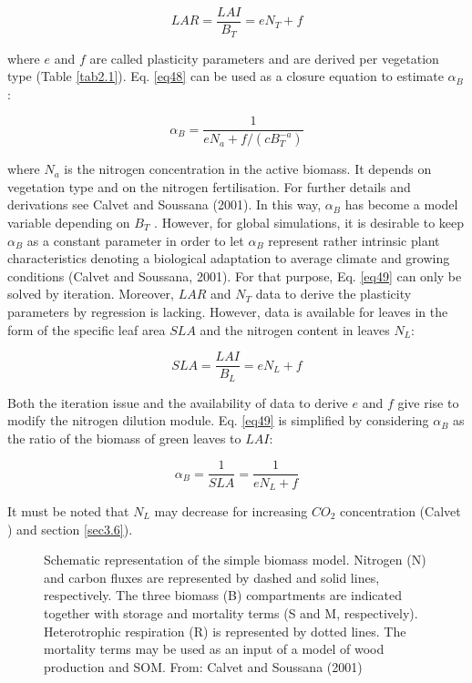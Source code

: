 {\begin{equation}\label{eq48}
LAR = \frac{LAI}{B_{T}}=eN_{T}+f
\end{equation}


where $e$ and $f$ are called plasticity parameters and are derived per vegetation type (Table \ref{tab2.1}). Eq. \ref{eq48} 
can be used as a closure equation to estimate $\alpha_{B}$:

\begin{equation}\label{eq49}
\alpha_{B} = \frac{1}{eN_{a}+f/(cB_{T}^{-a})}
\end{equation}

where $N_{a}$ is the nitrogen concentration in the active biomass. It depends on vegetation type and on the
nitrogen fertilisation. For further details and derivations see Calvet and Soussana (2001). In this way,
$\alpha_{B}$ has become a model variable depending on $B_{T}$ . However, for global simulations, it is desirable to
keep $\alpha_{B}$ as a constant parameter in order to let $\alpha_{B}$ represent rather intrinsic plant characteristics
denoting a biological adaptation to average climate and growing
conditions (Calvet and Soussana, 2001). 
For that purpose, Eq. \ref{eq49} can only be solved by iteration. Moreover, $LAR$ and $N_{T}$ data to derive
the plasticity parameters by regression is lacking. However, data is available for leaves in the form of
the specific leaf area $SLA$ and the nitrogen content in leaves $N_{L}$:

\begin{equation}\label{eq50}
SLA = \frac{LAI}{B_{L}}=eN_{L}+f
\end{equation}

Both the iteration issue and the availability of data to derive $e$ and $f$ give rise to modify the nitrogen
dilution module. Eq. \ref{eq49} is simplified by considering $\alpha_{B}$ as the ratio of the biomass of green leaves to
$LAI$:

\begin{equation}\label{eq51}
\alpha_{B} = \frac{1}{SLA}=\frac{1}{eN_{L}+f}
\end{equation}

It must be noted that $N_{L}$ may decrease for increasing $CO_{2}$ concentration (Calvet ) and
section \ref{sec3.6}).

\begin{figure}[h]
\hspace*{2.cm}
\caption{Schematic representation of the simple biomass model. Nitrogen (N) and carbon fluxes
are represented by dashed and solid lines, respectively. The three biomass (B) compartments are
indicated together with storage and mortality terms (S and M, respectively). Heterotrophic respiration
(R) is represented by dotted lines. The mortality terms may be used as an input of a model of wood
production and SOM. From: Calvet and Soussana (2001)
\label{biom}}
\end{figure}

}
